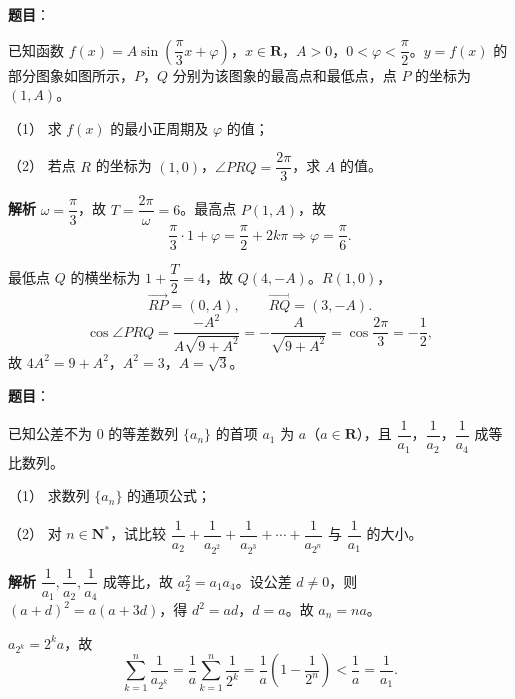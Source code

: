 \begin{answer}

\textbf{题目}：

已知函数 $f(x)=A\sin\left(\dfrac\pi3x+\varphi\right)$，$x\in\mathbf R$，$A>0$，$0<\varphi<\dfrac\pi2$。$y=f(x)$ 的部分图象如图所示，$P$，$Q$ 分别为该图象的最高点和最低点，点 $P$ 的坐标为 $(1,A)$。

（1） 求 $f(x)$ 的最小正周期及 $\varphi$ 的值；

（2） 若点 $R$ 的坐标为 $(1,0)$，$\angle PRQ=\dfrac{2\pi}3$，求 $A$ 的值。
\nopagebreak[4]
\begin{center}\end{center}
\nopagebreak[4]
\textbf{解析}
$\omega=\dfrac\pi3$，故 $T=\dfrac{2\pi}{\omega}=6$。最高点 $P(1,A)$，故
\nopagebreak[4]
\[\frac\pi3\cdot1+\varphi=\frac\pi2+2k\pi\Longrightarrow\varphi=\frac\pi6.\]

最低点 $Q$ 的横坐标为 $1+\dfrac T2=4$，故 $Q(4,-A)$。$R(1,0)$，
\nopagebreak[4]
\[\overrightarrow{RP}=(0,A),\qquad\overrightarrow{RQ}=(3,-A).\]
\nopagebreak[4]
\[\cos\angle PRQ=\frac{-A^2}{A\sqrt{9+A^2}}=-\frac{A}{\sqrt{9+A^2}}=\cos\frac{2\pi}3=-\frac12,\]
故 $4A^2=9+A^2$，$A^2=3$，$A=\sqrt3$。



\end{answer}
\begin{answer}

\textbf{题目}：

已知公差不为 $0$ 的等差数列 $\{a_n\}$ 的首项 $a_1$ 为 $a$（$a\in\mathbf R$），且 $\dfrac1{a_1}$，$\dfrac1{a_2}$，$\dfrac1{a_4}$ 成等比数列。

（1） 求数列 $\{a_n\}$ 的通项公式；

（2） 对 $n\in\mathbf N^*$，试比较 $\dfrac1{a_2}+\dfrac1{a_{2^2}}+\dfrac1{a_{2^3}}+\cdots+\dfrac1{a_{2^n}}$ 与 $\dfrac1{a_1}$ 的大小。

\textbf{解析}
$\dfrac1{a_1},\dfrac1{a_2},\dfrac1{a_4}$ 成等比，故 $a_2^2=a_1a_4$。设公差 $d\neq0$，则 $(a+d)^2=a(a+3d)$，得 $d^2=ad$，$d=a$。故 $a_n=na$。

$a_{2^k}=2^ka$，故
\nopagebreak[4]
\[\sum_{k=1}^n\frac1{a_{2^k}}=\frac1a\sum_{k=1}^n\frac1{2^k}=\frac1a\left(1-\frac1{2^n}\right)<\frac1a=\frac1{a_1}.\]



\end{answer}

